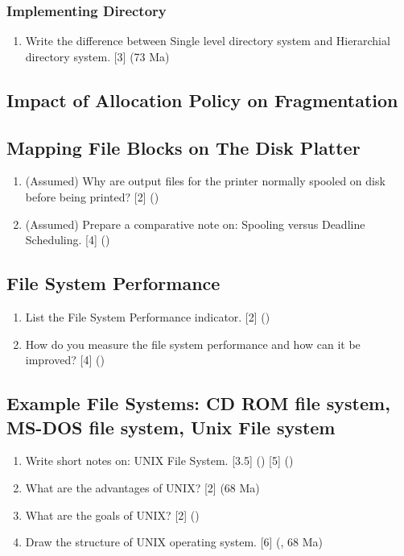 \documentclass[12pt]{article}
\begin{document}
		\subsubsection{Implementing Directory}
			\begin{enumerate}
				\item Write the difference between Single level directory system and Hierarchial directory system. \hfill [3] (73 Ma)
			\end{enumerate}

	\subsection{Impact of Allocation Policy on Fragmentation}
	\subsection{Mapping File Blocks on The Disk Platter}
		\begin{enumerate}
			\item (Assumed) Why are output files for the printer normally spooled on disk before being printed? \hfill [2] ()

			\item (Assumed) Prepare a comparative note on: Spooling versus Deadline Scheduling. \hfill [4] ()
		\end{enumerate}
		
	\subsection{File System Performance}
		\begin{enumerate}
			\item List the File System Performance indicator. \hfill [2] ()

			\item How do you measure the file system performance and how can it be improved? \hfill [4] ()
		\end{enumerate}

	\subsection{Example File Systems: CD ROM file system, MS-DOS file system, Unix File system}
		\begin{enumerate}
			\item Write short notes on: UNIX File System. \hfill [3.5] () [5] ()

			\item What are the advantages of UNIX? \hfill [2] (68 Ma)

			\item What are the goals of UNIX? \hfill [2] ()

			\item Draw the structure of UNIX operating system. \hfill [6] (, 68 Ma)
		\end{enumerate}
\end{document}
